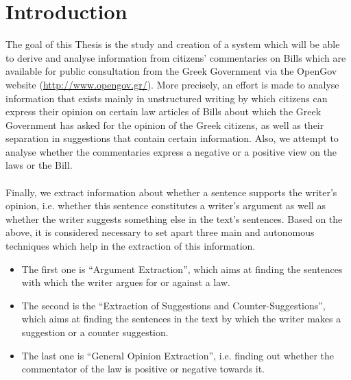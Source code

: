 \chapter{Introduction}\label{ch_1}
The goal of this Thesis is the study and creation of a system which will be able to derive and analyse information from citizens' commentaries on Bills which are available for public consultation from the Greek Government via the OpenGov website (\url{http://www.opengov.gr/}). More precisely, an effort is made to analyse information that exists mainly in unstructured writing by which citizens can express their opinion on certain law articles of Bills about which the Greek Government has asked for the opinion of the Greek citizens, as well as their separation in suggestions that contain certain information. Also, we attempt to analyse whether the commentaries express a negative or a positive view on the laws or the Bill.\\
\\
Finally, we extract information about whether a sentence supports the writer's opinion, i.e. whether this sentence constitutes a writer's argument as well as whether the writer suggests something else in the text's sentences. Based on the above, it is considered necessary to set apart three main and autonomous techniques which help in the extraction of this information.\\

\begin{itemize}

	\item The first one is ``Argument Extraction'', which aims at finding the sentences with which the writer argues for or against a law.
	\item The second is the ``Extraction of  Suggestions and Counter-Suggestions'', which aims at finding the sentences in the text by which the writer makes a suggestion or a counter suggestion.
	\item The last one is ``General Opinion Extraction'', i.e. finding out whether the commentator of the law is positive or negative towards it.

\end{itemize}

